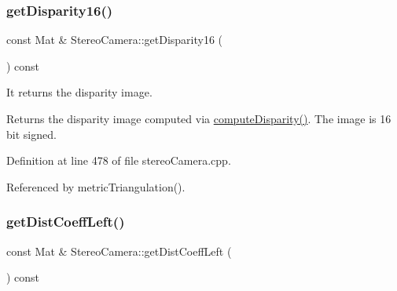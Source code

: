 \begin{DoxyCode}{0}

\end{DoxyCode}
\mbox{\label{classStereoCamera_a4a6e408446750224499ed9ecdc51629e}} 
\subsubsection{\texorpdfstring{getDisparity16()}{getDisparity16()}}
{\footnotesize\ttfamily const Mat \& Stereo\+Camera\+::get\+Disparity16 (\begin{DoxyParamCaption}{ }\end{DoxyParamCaption}) const}



It returns the disparity image. 

\begin{DoxyReturn}{Returns}
the disparity image computed via \mbox{\hyperlink{classStereoCamera_a79e986f2970bb2c5b5acd1ede65984aa}{compute\+Disparity()}}. The image is 16 bit signed. 
\end{DoxyReturn}


Definition at line 478 of file stereo\+Camera.\+cpp.


\begin{DoxyCode}{0}

\end{DoxyCode}


Referenced by metric\+Triangulation().

\mbox{\label{classStereoCamera_af9e52f941837f0db26d150d0ca4ff3bc}} 
\subsubsection{\texorpdfstring{getDistCoeffLeft()}{getDistCoeffLeft()}}
{\footnotesize\ttfamily const Mat \& Stereo\+Camera\+::get\+Dist\+Coeff\+Left (\begin{DoxyParamCaption}{ }\end{DoxyParamCaption}) const}



